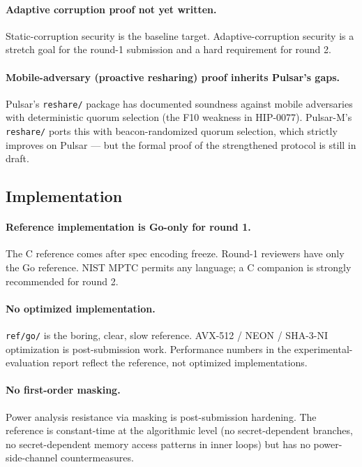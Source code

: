 \paragraph{Adaptive corruption proof not yet written.}
Static-corruption security is the baseline target.
Adaptive-corruption security is a stretch goal for the round-1
submission and a hard requirement for round 2.

\paragraph{Mobile-adversary (proactive resharing) proof inherits
Pulsar's gaps.}
Pulsar's \texttt{reshare/} package has documented soundness against
mobile adversaries with deterministic quorum selection (the F10
weakness in HIP-0077). Pulsar-M's \texttt{reshare/} ports this with
beacon-randomized quorum selection, which strictly improves on
Pulsar --- but the formal proof of the strengthened protocol is
still in draft.

\subsection{Implementation}

\paragraph{Reference implementation is Go-only for round 1.}
The C reference comes after spec encoding freeze. Round-1 reviewers
have only the Go reference. NIST MPTC permits any language; a C
companion is strongly recommended for round 2.

\paragraph{No optimized implementation.}
\texttt{ref/go/} is the boring, clear, slow reference. AVX-512 /
NEON / SHA-3-NI optimization is post-submission work. Performance
numbers in the experimental-evaluation report reflect the reference,
not optimized implementations.

\paragraph{No first-order masking.}
Power analysis resistance via masking is post-submission hardening.
The reference is constant-time at the algorithmic level (no
secret-dependent branches, no secret-dependent memory access
patterns in inner loops) but has no power-side-channel
countermeasures.

